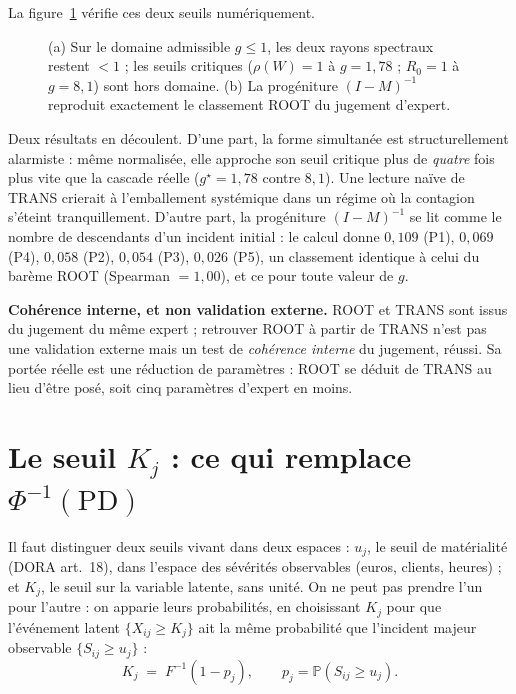 \noindent La figure~\ref{fig:branchement-R0} vérifie ces deux seuils numériquement.

\begin{figure}[htbp]\centering
{}
\caption{(a) Sur le domaine admissible $g\le1$, les deux rayons spectraux restent $<1$ ; les
seuils critiques ($\rho(W)=1$ à $g=1{,}78$ ; $R_0=1$ à $g=8{,}1$) sont hors domaine. (b) La
progéniture $(I-M)^{-1}$ reproduit exactement le classement ROOT du jugement d'expert.}
\label{fig:branchement-R0}
\end{figure}

Deux résultats en découlent. D'une part, la forme simultanée est structurellement
alarmiste : même normalisée, elle approche son seuil critique plus de \emph{quatre} fois plus
vite que la cascade réelle ($g^\star=1{,}78$ contre $8{,}1$). Une lecture naïve de TRANS crierait à
l'emballement systémique dans un régime où la contagion s'éteint tranquillement. D'autre part,
la progéniture $(I-M)^{-1}$ se lit comme le nombre de descendants d'un incident initial : le
calcul donne $0{,}109$ (P1), $0{,}069$ (P4), $0{,}058$ (P2), $0{,}054$ (P3), $0{,}026$ (P5), un
classement identique à celui du barème ROOT (Spearman $=1{,}00$), et ce pour toute
valeur de $g$.

\begin{attention}
\textbf{Cohérence interne, et non validation externe.} ROOT et TRANS sont issus du jugement du
même expert ; retrouver ROOT à partir de TRANS n'est pas une validation externe mais un test de
\emph{cohérence interne} du jugement, réussi. Sa portée réelle est une réduction de
paramètres : ROOT se déduit de TRANS au lieu d'être posé, soit cinq paramètres d'expert en
moins.
\end{attention}


\section{Le seuil $K_j$ : ce qui remplace $\Phi^{-1}(\mathrm{PD})$}

Il faut distinguer deux seuils vivant dans deux espaces : $u_j$, le seuil de matérialité
(DORA art.~18), dans l'espace des sévérités observables (euros, clients, heures) ; et $K_j$, le
seuil sur la variable latente, sans unité. On ne peut pas prendre l'un pour l'autre : on
apparie leurs probabilités, en choisissant $K_j$ pour que l'événement latent
$\{X_{ij}\ge K_j\}$ ait la même probabilité que l'incident majeur observable
$\{S_{ij}\ge u_j\}$ :
\begin{equation}
\label{eq:Kj}
\boxed{\;K_j\;=\;F^{-1}(1-p_j), \qquad p_j=\mathbb P(S_{ij}\ge u_j).\;}
\end{equation}

